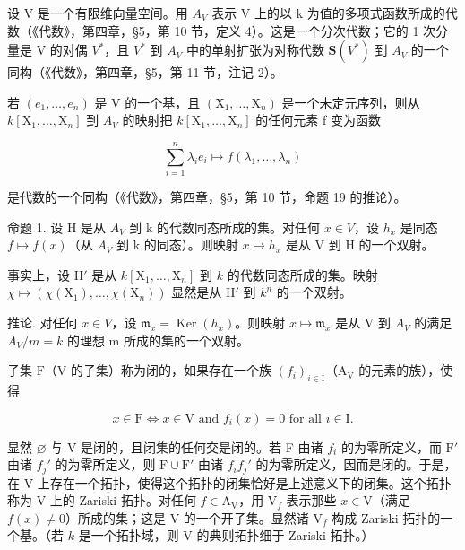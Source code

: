 
设 V 是一个有限维向量空间。用 \(A_{V}\) 表示 V 上的以 k 为值的多项式函数所成的代数（《代数》，第四章，§5，第 10 节，定义 4）。这是一个分次代数；它的 1 次分量是 V 的对偶 \(V^{*}\)，且 \(V^{*}\) 到 \(A_{V}\) 中的单射扩张为对称代数 \(\mathbf{S}(V^{*})\) 到 \(A_{V}\) 的一个同构（《代数》，第四章，§5，第 11 节，注记 2）。

若 \((e_{1},\ldots,e_{n})\) 是 V 的一个基，且 \((\mathrm{X}_{1},\ldots,\mathrm{X}_{n})\) 是一个未定元序列，则从 \(k[\mathrm{X}_{1},\ldots,\mathrm{X}_{n}]\) 到 \(A_{V}\) 的映射把 \(k[\mathrm{X}_{1},\ldots,\mathrm{X}_{n}]\) 的任何元素 f 变为函数

\[
\sum_ {i = 1} ^ {n} \lambda_ {i} e _ {i} \mapsto f (\lambda_ {1}, \ldots , \lambda_ {n})
\]

是代数的一个同构（《代数》，第四章，§5，第 10 节，命题 19 的推论）。

命题 1. 设 H 是从 \(A_{V}\) 到 k 的代数同态所成的集。对任何 \(x \in V\)，设 \(h_{x}\) 是同态 \(f \mapsto f(x)\)（从 \(A_{V}\) 到 k 的同态）。则映射 \(x \mapsto h_{x}\) 是从 V 到 H 的一个双射。

事实上，设 \(\mathrm{H}'\) 是从 \(k[\mathrm{X}_1,\ldots ,\mathrm{X}_n]\) 到 \(k\) 的代数同态所成的集。映射 \(\chi \mapsto (\chi (\mathrm{X}_1),\dots ,\chi (\mathrm{X}_n))\) 显然是从 \(\mathrm{H}'\) 到 \(k^n\) 的一个双射。

推论. 对任何 \(x \in V\)，设 \(\mathfrak{m}_{x} = \operatorname{Ker}(h_{x})\)。则映射 \(x \mapsto \mathfrak{m}_{x}\) 是从 V 到 \(A_{V}\) 的满足 \(A_{V}/m = k\) 的理想 m 所成的集的一个双射。

子集 \(\mathrm{F}\)（\(\mathrm{V}\) 的子集）称为闭的，如果存在一个族 \((f_i)_{i\in \mathrm{I}}\)（\(\mathrm{A_V}\) 的元素的族），使得

\[
x \in \mathrm{F} \Longleftrightarrow x \in \mathrm{V} \text {   and   } f _ {i} (x) = 0 \text {   for   all   } i \in \mathrm{I}.
\]

显然 \(\varnothing\) 与 V 是闭的，且闭集的任何交是闭的。若 F 由诸 \(f_{i}\) 的为零所定义，而 \(\mathrm{F}'\) 由诸 \(f_j'\) 的为零所定义，则 \(\mathrm{F} \cup \mathrm{F}'\) 由诸 \(f_{i}f_{j}'\) 的为零所定义，因而是闭的。于是，在 V 上存在一个拓扑，使得这个拓扑的闭集恰好是上述意义下的闭集。这个拓扑称为 V 上的 Zariski 拓扑。对任何 \(f \in \mathrm{A_V}\)，用 \(\mathrm{V}_f\) 表示那些 \(x \in \mathrm{V}\)（满足 \(f(x) \neq 0\)）所成的集；这是 V 的一个开子集。显然诸 \(\mathrm{V}_f\) 构成 Zariski 拓扑的一个基。（若 \(k\) 是一个拓扑域，则 V 的典则拓扑细于 Zariski 拓扑。）

